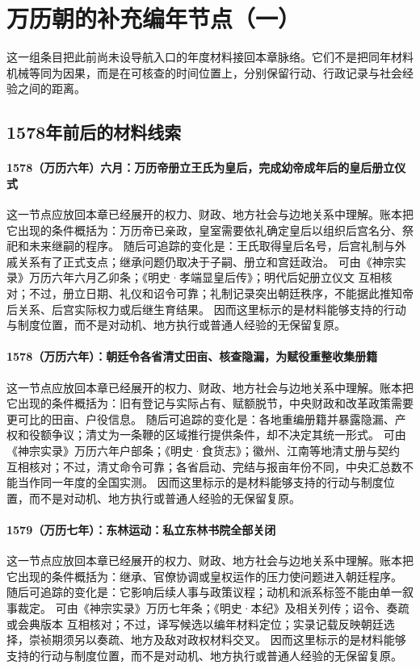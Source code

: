 \section{万历朝的补充编年节点（一）}
这一组条目把此前尚未设导航入口的年度材料接回本章脉络。它们不是把同年材料机械等同为因果，而是在可核查的时间位置上，分别保留行动、行政记录与社会经验之间的距离。

\subsection{1578年前后的材料线索}

\paragraph{1578（万历六年）六月：万历帝册立王氏为皇后，完成幼帝成年后的皇后册立仪式} 这一节点应放回本章已经展开的权力、财政、地方社会与边地关系中理解。账本把它出现的条件概括为：万历帝已亲政，皇室需要依礼确定皇后以组织后宫名分、祭祀和未来继嗣的程序。 随后可追踪的变化是：王氏取得皇后名号，后宫礼制与外戚关系有了正式支点；继承问题仍取决于子嗣、册立和宫廷政治。 可由《神宗实录》万历六年六月乙卯条；《明史·孝端显皇后传》；明代后妃册立仪文 互相核对；不过，册立日期、礼仪和诏令可靠；礼制记录突出朝廷秩序，不能据此推知帝后关系、后宫实际权力或后继生育结果。 因而这里标示的是材料能够支持的行动与制度位置，而不是对动机、地方执行或普通人经验的无保留复原。

\paragraph{1578（万历六年）：朝廷令各省清丈田亩、核查隐漏，为赋役重整收集册籍} 这一节点应放回本章已经展开的权力、财政、地方社会与边地关系中理解。账本把它出现的条件概括为：旧有登记与实际占有、赋额脱节，中央财政和改革政策需要更可比的田亩、户役信息。 随后可追踪的变化是：各地重编册籍并暴露隐漏、产权和役额争议；清丈为一条鞭的区域推行提供条件，却不决定其统一形式。 可由《神宗实录》万历六年户部条；《明史·食货志》；徽州、江南等地清丈册与契约 互相核对；不过，清丈命令可靠；各省启动、完结与报亩年份不同，中央汇总数不能当作同一年度的全国实测。 因而这里标示的是材料能够支持的行动与制度位置，而不是对动机、地方执行或普通人经验的无保留复原。

\paragraph{1579（万历七年）：东林运动：私立东林书院全部关闭} 这一节点应放回本章已经展开的权力、财政、地方社会与边地关系中理解。账本把它出现的条件概括为：继承、官僚协调或皇权运作的压力使问题进入朝廷程序。 随后可追踪的变化是：它影响后续人事与政策议程；动机和派系标签不能由单一叙事裁定。 可由《神宗实录》万历七年条；《明史·本纪》及相关列传；诏令、奏疏或会典版本 互相核对；不过，译写候选以编年材料定位；实录记载反映朝廷选择，崇祯期须另以奏疏、地方及敌对政权材料交叉。 因而这里标示的是材料能够支持的行动与制度位置，而不是对动机、地方执行或普通人经验的无保留复原。

